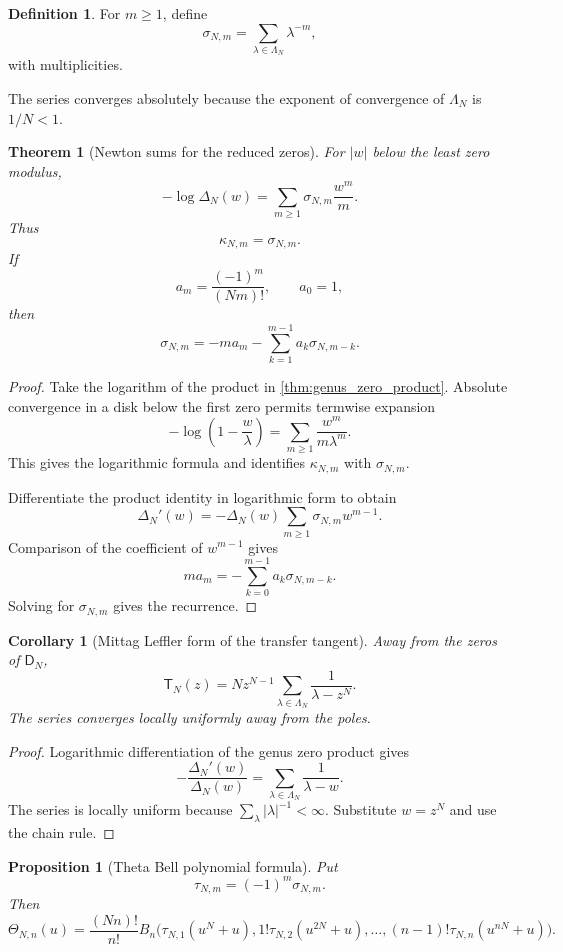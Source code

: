 \documentclass{aomart}
\newtheorem{theorem}{Theorem}[section]
\newtheorem{proposition}[proposition]{Proposition}
\newtheorem{corollary}[corollary]{Corollary}
\theoremstyle{definition}
\newtheorem{definition}[definition]{Definition}
\theoremstyle{remark}
\newcommand{\Dfun}{\mathsf D}
\newcommand{\Tfun}{\mathsf T}
\newcommand{\Thetafun}{\mathsf\Theta}
\begin{document}
\begin{definition}\label{def:zero_power_sums}
For $m\geq1$, define
\[
\sigma_{N,m}
=
\sum_{\lambda\in\Lambda_N}\lambda^{-m},
\]
with multiplicities.
\end{definition}

The series converges absolutely because the exponent of convergence of $\Lambda_N$ is $1/N<1$.

\begin{theorem}[Newton sums for the reduced zeros]\label{thm:newton_sums}
For $|w|$ below the least zero modulus,
\[
-\log\Delta_N(w)
=
\sum_{m\geq1}\sigma_{N,m}\frac{w^m}{m}.
\]
Thus
\[
\kappa_{N,m}=\sigma_{N,m}.
\]
If
\[
a_m=\frac{(-1)^m}{(Nm)!},
\qquad a_0=1,
\]
then
\[
\sigma_{N,m}
=
-ma_m-
\sum_{k=1}^{m-1}a_k\sigma_{N,m-k}.
\]
\end{theorem}

\begin{proof}
Take the logarithm of the product in \cref{thm:genus_zero_product}.  Absolute convergence in a disk below the first zero permits termwise expansion
\[
-\log\left(1-\frac w\lambda\right)
=
\sum_{m\geq1}\frac{w^m}{m\lambda^m}.
\]
This gives the logarithmic formula and identifies $\kappa_{N,m}$ with $\sigma_{N,m}$.

Differentiate the product identity in logarithmic form to obtain
\[
\Delta_N'(w)
=
-\Delta_N(w)
\sum_{m\geq1}\sigma_{N,m}w^{m-1}.
\]
Comparison of the coefficient of $w^{m-1}$ gives
\[
ma_m
=
-\sum_{k=0}^{m-1}a_k\sigma_{N,m-k}.
\]
Solving for $\sigma_{N,m}$ gives the recurrence.
\end{proof}



\begin{corollary}[Mittag Leffler form of the transfer tangent]\label{cor:mittag_leffler_tangent}
Away from the zeros of $\Dfun_N$,
\[
\Tfun_N(z)
=
Nz^{N-1}
\sum_{\lambda\in\Lambda_N}
\frac1{\lambda-z^N}.
\]
The series converges locally uniformly away from the poles.
\end{corollary}

\begin{proof}
Logarithmic differentiation of the genus zero product gives
\[
-\frac{\Delta_N'(w)}{\Delta_N(w)}
=
\sum_{\lambda\in\Lambda_N}\frac1{\lambda-w}.
\]
The series is locally uniform because $\sum_{\lambda}|\lambda|^{-1}<\infty$.  Substitute $w=z^N$ and use the chain rule.
\end{proof}

\begin{proposition}[Theta Bell polynomial formula]\label{prop:theta_bell}
Put
\[
\tau_{N,m}=(-1)^m\sigma_{N,m}.
\]
Then
\[
\Thetafun_{N,n}(u)
=
\frac{(Nn)!}{n!}
B_n\bigl(
 \tau_{N,1}(u^N+u),
 1!\tau_{N,2}(u^{2N}+u),
 \ldots,
 (n-1)!\tau_{N,n}(u^{nN}+u)
\bigr).
\]
\end{proposition}
\end{document}
